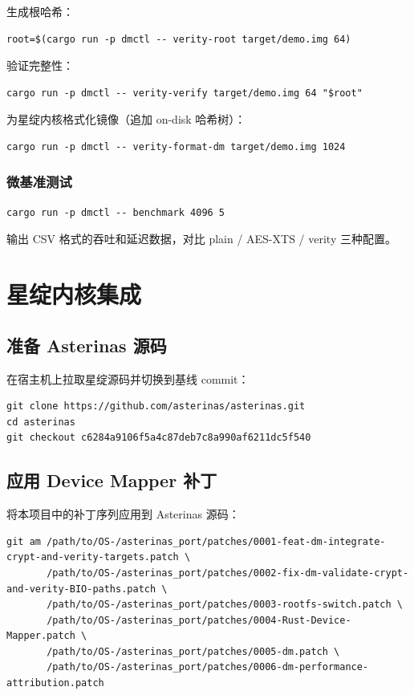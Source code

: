 生成根哈希：
\begin{lstlisting}[basicstyle=\ttfamily\small, breaklines=true]
root=$(cargo run -p dmctl -- verity-root target/demo.img 64)
\end{lstlisting}

验证完整性：
\begin{lstlisting}[basicstyle=\ttfamily\small, breaklines=true]
cargo run -p dmctl -- verity-verify target/demo.img 64 "$root"
\end{lstlisting}

为星绽内核格式化镜像（追加 on-disk 哈希树）：
\begin{lstlisting}[basicstyle=\ttfamily\small, breaklines=true]
cargo run -p dmctl -- verity-format-dm target/demo.img 1024
\end{lstlisting}

\subsubsection{微基准测试}

\begin{lstlisting}[basicstyle=\ttfamily\small, breaklines=true]
cargo run -p dmctl -- benchmark 4096 5
\end{lstlisting}

输出 CSV 格式的吞吐和延迟数据，对比 plain / AES-XTS / verity 三种配置。

\section{星绽内核集成}

\subsection{准备 Asterinas 源码}

在宿主机上拉取星绽源码并切换到基线 commit：
\begin{lstlisting}[basicstyle=\ttfamily\small, breaklines=true]
git clone https://github.com/asterinas/asterinas.git
cd asterinas
git checkout c6284a9106f5a4c87deb7c8a990af6211dc5f540
\end{lstlisting}

\subsection{应用 Device Mapper 补丁}

将本项目中的补丁序列应用到 Asterinas 源码：
\begin{lstlisting}[basicstyle=\ttfamily\small, breaklines=true]
git am /path/to/OS-/asterinas_port/patches/0001-feat-dm-integrate-crypt-and-verity-targets.patch \
       /path/to/OS-/asterinas_port/patches/0002-fix-dm-validate-crypt-and-verity-BIO-paths.patch \
       /path/to/OS-/asterinas_port/patches/0003-rootfs-switch.patch \
       /path/to/OS-/asterinas_port/patches/0004-Rust-Device-Mapper.patch \
       /path/to/OS-/asterinas_port/patches/0005-dm.patch \
       /path/to/OS-/asterinas_port/patches/0006-dm-performance-attribution.patch
\end{lstlisting}

